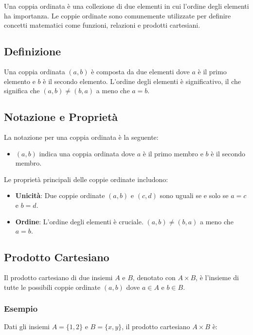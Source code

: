 \documentclass{article}
\begin{document}
Una coppia ordinata è una collezione di due elementi in cui l'ordine degli elementi ha importanza. Le coppie ordinate sono comunemente utilizzate per definire concetti matematici come funzioni, relazioni e prodotti cartesiani.

\subsection{Definizione}

Una coppia ordinata $(a, b)$ è composta da due elementi dove $a$ è il primo elemento e $b$ è il secondo elemento. L'ordine degli elementi è significativo, il che significa che $(a, b) \neq (b, a)$ a meno che $a = b$.

\subsection{Notazione e Proprietà}

La notazione per una coppia ordinata è la seguente:

\begin{itemize}
    \item $(a, b)$ indica una coppia ordinata dove $a$ è il primo membro e $b$ è il secondo membro.
\end{itemize}

Le proprietà principali delle coppie ordinate includono:

\begin{itemize}
    \item \textbf{Unicità}: Due coppie ordinate $(a, b)$ e $(c, d)$ sono uguali se e solo se $a = c$ e $b = d$.
    \item \textbf{Ordine}: L'ordine degli elementi è cruciale. $(a, b) \neq (b, a)$ a meno che $a = b$.
\end{itemize}

\subsection{Prodotto Cartesiano}

Il prodotto cartesiano di due insiemi $A$ e $B$, denotato con $A \times B$, è l'insieme di tutte le possibili coppie ordinate $(a, b)$ dove $a \in A$ e $b \in B$. 

\subsubsection{Esempio}

Dati gli insiemi $A = \{1, 2\}$ e $B = \{x, y\}$, il prodotto cartesiano $A \times B$ è:
\end{document}
